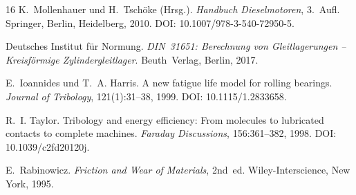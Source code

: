 ﻿\documentclass[12pt,a4paper]{article}
\begin{document}
\begin{thebibliography}{16}
  K.~Mollenhauer und H.~Tschöke (Hrsg.).
  \textit{Handbuch Dieselmotoren}, 3.~Aufl.
  Springer, Berlin, Heidelberg, 2010.
  DOI: 10.1007/978-3-540-72950-5.

  Deutsches Institut für Normung.
  \textit{DIN~31651: Berechnung von Gleitlagerungen -- Kreisförmige Zylindergleitlager}.
  Beuth~Verlag, Berlin, 2017.

  E.~Ioannides und T.~A. Harris.
  A new fatigue life model for rolling bearings.
  \textit{Journal of Tribology}, 121(1):31--38, 1999.
  DOI: 10.1115/1.2833658.

  R.~I. Taylor.
  Tribology and energy efficiency: From molecules to lubricated contacts to complete machines.
  \textit{Faraday Discussions}, 156:361--382, 1998.
  DOI: 10.1039/c2fd20120j.

  E.~Rabinowicz.
  \textit{Friction and Wear of Materials}, 2nd~ed.
  Wiley-Interscience, New York, 1995.

\end{thebibliography}
\end{document}
